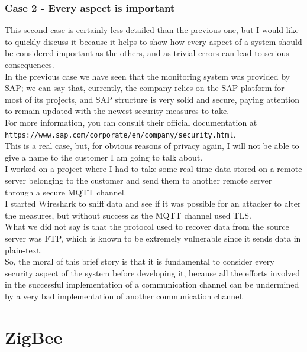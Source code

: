 \documentclass[12pt]{report}
\begin{document}
{{\section{Case 2 - Every aspect is important }
\bigskip
This second case is certainly less detailed than the previous one, but I would like to quickly discuss it because it helps to show how every aspect of a system should be considered important as the others, and as trivial errors can lead to serious consequences.\\

In the previous case we have seen that the monitoring system was provided by SAP; we can say that, currently, the company relies on the SAP platform for most of its projects, and SAP structure is very solid and secure, paying attention to remain updated with the newest security measures to take.\\
For more information, you can consult their official documentation at \\ \texttt{https://www.sap.com/corporate/en/company/security.html}.\\

This is a real case, but, for obvious reasons of privacy again, I will not be able to give a name to the customer I am going to talk about.\\

I worked on a project where I had to take some real-time data stored on a remote server belonging to the customer and send them to another remote server through a secure MQTT channel.\\
I started Wireshark to sniff data and see if it was possible for an attacker to alter the measures, but without success as the MQTT channel used TLS.\\

What we did not say is that the protocol used to recover data from the source server was FTP, which is known to be extremely vulnerable since it sends data in plain-text.\\


So, the moral of this brief story is that it is fundamental to consider every security aspect of the system before developing it, because all the efforts involved in the successful implementation of a communication channel can be undermined by a very bad implementation of another communication channel.\\


\part{ZigBee}

}}
\end{document}

